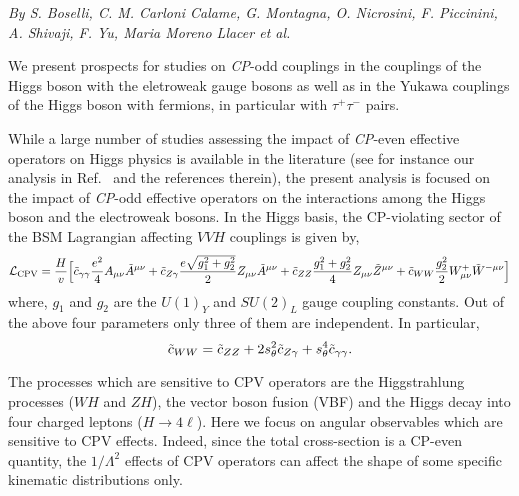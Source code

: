\begin{center}
\textit{By S. Boselli, C. M. Carloni Calame, G. Montagna,
  O. Nicrosini, F. Piccinini, A. Shivaji, F. Yu, Maria Moreno Llacer
  et al.}
\end{center}

 We present prospects for studies on {\it CP}-odd couplings in the
 couplings of the Higgs boson with the eletroweak gauge bosons as well
 as in the Yukawa couplings of the Higgs boson with fermions, in
 particular with $\tau^+ \tau^-$ pairs.
 

While a large number of studies assessing the impact of {\it CP}-even  
effective operators on Higgs physics is available in the literature 
(see for instance our analysis in Ref.~\cite{Boselli:2017pef} and the references therein), 
the present analysis is focused on the impact of {\it CP}-odd effective operators on the 
interactions among the Higgs boson and the electroweak bosons. 
In the Higgs basis, the CP-violating sector of the BSM Lagrangian affecting $VVH$ couplings 
is given by, 
% 
\begin{eqnarray}
\mathcal{L}_{\rm CPV} =  \frac{H}{v} \Big[
\tilde c_{\gamma\gamma} \frac{e^2}{4} A_{\mu\nu}\tilde{A}^{\mu\nu}  
+ \tilde c_{Z\gamma} \frac{e\sqrt{g_1^2 + g_2^2}}{2} Z_{\mu\nu}\tilde{A}^{\mu\nu} 
+ \tilde c_{ZZ} \frac{g_1^2 + g_2^2}{4} Z_{\mu\nu}\tilde{Z}^{\mu\nu} + \tilde{c}_{WW} \frac{g_2^2}{2}  W^+_{\mu\nu} \tilde W^{-\mu\nu}\Big]
\label{eqn:Hvv}
\end{eqnarray}  
where, $g_1$ and $g_2$ are the $U(1)_Y$  and  $SU(2)_L$ gauge coupling constants. Out of the above four 
parameters only three of them  are independent. In particular,
\begin{equation}
 \tilde c_{WW} = \tilde c_{ZZ} + 2s_\theta^2 \tilde c_{Z\gamma} + s_\theta^4 \tilde c_{\gamma\gamma}.
\end{equation}

The processes which are sensitive to CPV operators are the Higgstrahlung processes ($WH$ and $ZH$), the vector boson fusion (VBF) and the Higgs decay into four charged leptons ($H\to4\ell$). Here we focus on angular observables which are sensitive to CPV effects. Indeed, since the total cross-section is a CP-even quantity,  the $1/\Lambda^2$ effects of CPV operators can affect the shape of some specific kinematic distributions only. 



